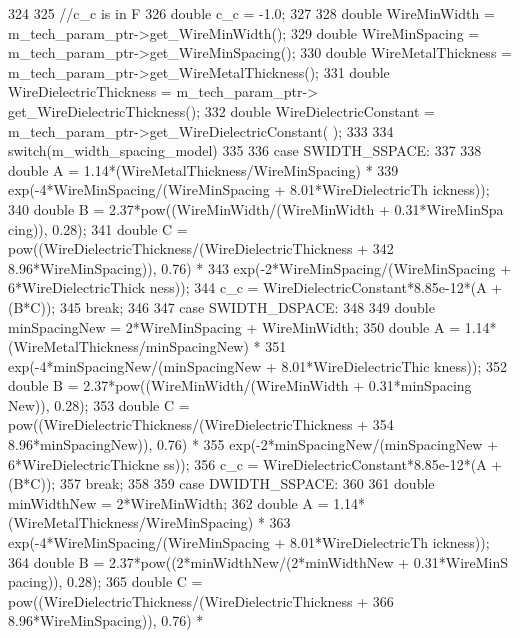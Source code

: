 \begin{DoxyCode}
324 {
325     //c_c is in F
326     double c_c = -1.0;
327 
328     double WireMinWidth = m_tech_param_ptr->get_WireMinWidth();
329     double WireMinSpacing = m_tech_param_ptr->get_WireMinSpacing();
330     double WireMetalThickness = m_tech_param_ptr->get_WireMetalThickness();
331     double WireDielectricThickness = m_tech_param_ptr->
      get_WireDielectricThickness();
332     double WireDielectricConstant = m_tech_param_ptr->get_WireDielectricConstant(
      );
333 
334     switch(m_width_spacing_model)
335     {
336         case SWIDTH_SSPACE:
337             {
338                 double A = 1.14*(WireMetalThickness/WireMinSpacing) *
339                     exp(-4*WireMinSpacing/(WireMinSpacing + 8.01*WireDielectricTh
      ickness));
340                 double B = 2.37*pow((WireMinWidth/(WireMinWidth + 0.31*WireMinSpa
      cing)), 0.28);
341                 double C = pow((WireDielectricThickness/(WireDielectricThickness 
      +
342                                 8.96*WireMinSpacing)), 0.76) *
343                     exp(-2*WireMinSpacing/(WireMinSpacing + 6*WireDielectricThick
      ness));
344                 c_c = WireDielectricConstant*8.85e-12*(A + (B*C));
345                 break;
346             }
347         case SWIDTH_DSPACE:
348             {
349                 double minSpacingNew = 2*WireMinSpacing + WireMinWidth;
350                 double A = 1.14*(WireMetalThickness/minSpacingNew) *
351                     exp(-4*minSpacingNew/(minSpacingNew + 8.01*WireDielectricThic
      kness));
352                 double B = 2.37*pow((WireMinWidth/(WireMinWidth + 0.31*minSpacing
      New)), 0.28);
353                 double C = pow((WireDielectricThickness/(WireDielectricThickness 
      +
354                                 8.96*minSpacingNew)), 0.76) *
355                     exp(-2*minSpacingNew/(minSpacingNew + 6*WireDielectricThickne
      ss));
356                 c_c = WireDielectricConstant*8.85e-12*(A + (B*C));
357                 break;
358             }
359         case DWIDTH_SSPACE:
360             {
361                 double minWidthNew = 2*WireMinWidth;
362                 double A = 1.14*(WireMetalThickness/WireMinSpacing) *
363                     exp(-4*WireMinSpacing/(WireMinSpacing + 8.01*WireDielectricTh
      ickness));
364                 double B = 2.37*pow((2*minWidthNew/(2*minWidthNew + 0.31*WireMinS
      pacing)), 0.28);
365                 double C = pow((WireDielectricThickness/(WireDielectricThickness 
      +
366                                 8.96*WireMinSpacing)), 0.76) *
}}}
\end{DoxyCode}
